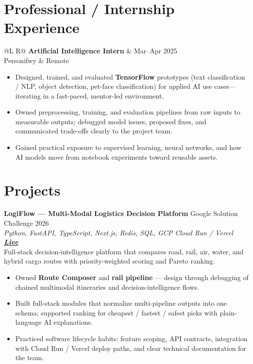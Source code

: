 \documentclass[a4paper,10pt]{article}
\makeatletter
\newcommand{\entry}[4]{%
  \vspace{0.5mm}
  \noindent\begin{tabularx}{\textwidth}{@{}L R@{}}
    \textbf{#1} & {\small #2} \\
    {\small #3} & {\small #4} \\
  \end{tabularx}\par
}
\makeatother
\begin{document}
\section{Professional / Internship Experience}
\entry{Artificial Intelligence Intern}{Mar--Apr 2025}{Personifwy}{Remote}
\begin{itemize}
  \item Designed, trained, and evaluated \textbf{TensorFlow} prototypes (text classification / NLP, object detection, pet-face classification) for applied AI use cases---iterating in a fast-paced, mentor-led environment.
  \item Owned preprocessing, training, and evaluation pipelines from raw inputs to measurable outputs; debugged model issues, proposed fixes, and communicated trade-offs clearly to the project team.
  \item Gained practical exposure to supervised learning, neural networks, and how AI models move from notebook experiments toward reusable assets.
\end{itemize}

\section{Projects}
\vspace{0.6mm}
\noindent\textbf{LogiFlow --- Multi-Modal Logistics Decision Platform}
\hfill {\small Google Solution Challenge 2026}\\
\textit{\small Python, FastAPI, TypeScript, Next.js, Redis, SQL, GCP Cloud Run / Vercel \textbar{}
\href{https://logi-flow-solution-challenge-2026.vercel.app/}{\textbf{Live}}}\\[0.4mm]
Full-stack decision-intelligence platform that compares road, rail, air, water, and hybrid cargo routes with priority-weighted scoring and Pareto ranking.
\begin{itemize}
  \item Owned \textbf{Route Composer} and \textbf{rail pipeline} --- design through debugging of chained multimodal itineraries and decision-intelligence flows.
  \item Built full-stack modules that normalize multi-pipeline outputs into one schema; supported ranking for cheapest / fastest / safest picks with plain-language AI explanations.
  \item Practiced software lifecycle habits: feature scoping, API contracts, integration with Cloud Run / Vercel deploy paths, and clear technical documentation for the team.
\end{itemize}
\end{document}
